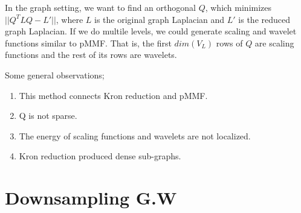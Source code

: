 \documentclass[a4paper]{article}
\begin{document}
In the graph setting, we want to find an orthogonal $Q$, which minimizes $||Q^TLQ - L'||$, where $L$ is the original graph Laplacian and $L'$ is the reduced graph Laplacian. If we do multile levels, we could generate scaling and wavelet functions similar to pMMF. That is, the first $dim(V_L)$ rows of $Q$ are scaling functions and the rest of its rows are wavelets.

Some general observations;
\begin{enumerate}
\item This method connects Kron reduction and pMMF.
\item Q is not sparse.
\item The energy of scaling functions and wavelets are not localized.
\item Kron reduction produced dense sub-graphs.
\end{enumerate}

\section{Downsampling G.W}
\end{document}
